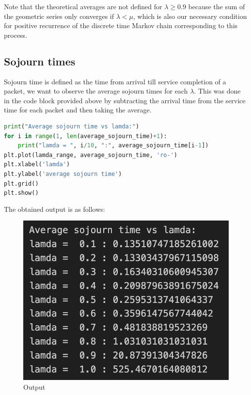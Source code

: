 \documentclass[11pt, a4paper]{article}
\begin{document}
Note that the theoretical averages are not defined for $\lambda \ge 0.9$ because the sum of the geometric series only converges if $\lambda < \mu$, which is also our necessary condition for positive recurrence of the discrete time Markov chain corresponding to this process.

\subsection{Sojourn times}
Sojourn time is defined as the time from arrival till service completion of a packet, we want to observe the average sojourn times for each $\lambda$. This was done in the code block provided above by subtracting the arrival time from the service time for each packet and then taking the average. 
\\
\begin{lstlisting}[language = Python]
print("Average sojourn time vs lamda:")
for i in range(1, len(average_sojourn_time)+1):
    print("lamda = ", i/10, ":", average_sojourn_time[i-1])
plt.plot(lamda_range, average_sojourn_time, 'ro-')
plt.xlabel('lamda')
plt.ylabel('average sojourn time')
plt.grid()
plt.show()
\end{lstlisting}
The obtained output is as follows:
\begin{figure}[H]
     \centering
     \includegraphics[scale=0.3]{Figure_3.png}
     \caption{Output}
\end{figure}
\end{document}
